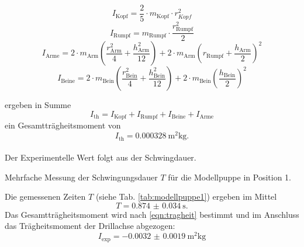 \begin{equation*}
    I_\text{Kopf} = \frac{2}{5} \cdot m_\text{Kopf} \cdot r_{Kopf}^2
\end{equation*}
\begin{equation*}
    I_\text{Rumpf} = m_\text{Rumpf} \cdot \frac{r_\text{Rumpf}^2}{2}
\end{equation*}
\begin{equation*}
    I_\text{Arme} = 2 \cdot m_\text{Arm} \left(\frac{r_\text{Arm}^2}{4} + \frac{h_\text{Arm}^2}{12}\right) + 2 \cdot m_\text{Arm}\left(r_\text{Rumpf} + \frac{h_\text{Arm}}{2}\right)^2
\end{equation*}
\begin{equation*}
    I_\text{Beine} = 2 \cdot m_\text{Bein} \left(\frac{r_\text{Bein}^2}{4} + \frac{h_\text{Bein}^2}{12} \right) + 2 \cdot m_\text{Bein} \left(\frac{h_\text{Bein}}{2}\right)^2
\end{equation*}

ergeben in Summe
\begin{equation*}
    I_\text{th} = I_\text{Kopf} + I_\text{Rumpf} + I_\text{Beine} + I_\text{Arme}
\end{equation*}
ein Gesamtträgheitsmoment von
\begin{equation*}
    I_\text{th} = \SI{0.000328}{\metre^2\kg} .
\end{equation*}
\\
Der Experimentelle Wert folgt aus der Schwingdauer.
\begin{table}
    \centering
    \caption{Mehrfache Messung der Schwingungsdauer $T$ für die Modellpuppe in Position 1.}
    \label{tab:modellpuppe1}  
\end{table}
Die gemessenen Zeiten $T$ (siehe Tab. \ref{tab:modellpuppe1}) ergeben im Mittel
\begin{equation*}
    T = \SI{0.874(34)}{\second} .
\end{equation*}
Das Gesamtträgheitsmoment wird nach \autoref{eqn:tragheit} bestimmt und im Anschluss das Trägheitsmoment der Drillachse abgezogen:
\begin{equation*}
    I_\text{exp} = \SI{-0.0032(19)}{\metre^2\kg}
\end{equation*}
\FloatBarrier


